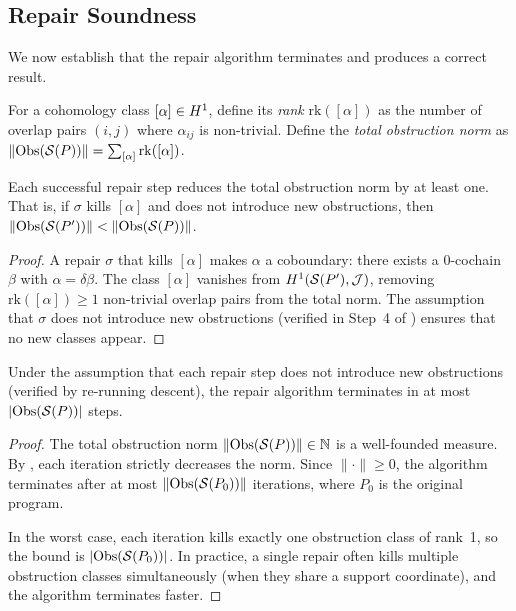 \subsection{Repair Soundness}\label{sec:repair-soundness}

We now establish that the repair algorithm terminates and produces
a correct result.

\begin{definition}\label{def:cocycle-norm}
For a cohomology class $[\alpha] \in H^{1}$, define its
\emph{rank} $\mathrm{rk}([\alpha])$ as the number of overlap pairs
$(i,j)$ where $\alpha_{ij}$ is non-trivial.  Define the
\emph{total obstruction norm} as
$\lVert \mathrm{Obs}(\mathcal{S}(P)) \rVert =
 \sum_{[\alpha]} \mathrm{rk}([\alpha])$.
\end{definition}

\begin{lemma}\label{lem:norm-reduce}
Each successful repair step reduces the total obstruction norm by at
least one.  That is, if $\sigma$ kills $[\alpha]$ and does not
introduce new obstructions, then
$\lVert \mathrm{Obs}(\mathcal{S}(P')) \rVert <
 \lVert \mathrm{Obs}(\mathcal{S}(P)) \rVert$.
\end{lemma}

\begin{proof}
A repair $\sigma$ that kills $[\alpha]$ makes $\alpha$ a coboundary:
there exists a 0-cochain $\beta$ with $\alpha = \delta\beta$.  The
class $[\alpha]$ vanishes from $H^{1}(\mathcal{S}(P'), \mathcal{J})$, removing
$\mathrm{rk}([\alpha]) \geq 1$ non-trivial overlap pairs from the
total norm.  The assumption that $\sigma$ does not introduce new
obstructions (verified in Step~4 of ) ensures
that no new classes appear.
\end{proof}

\begin{theorem}\label{thm:repair-term}
Under the assumption that each repair step does not introduce new
obstructions (verified by re-running descent), the repair algorithm
terminates in at most $\lvert \mathrm{Obs}(\mathcal{S}(P)) \rvert$ steps.
\end{theorem}

\begin{proof}
The total obstruction norm
$\lVert \mathrm{Obs}(\mathcal{S}(P)) \rVert \in \mathbb{N}$ is a
well-founded measure.  By , each iteration
strictly decreases the norm.  Since $\lVert \cdot \rVert \geq 0$,
the algorithm terminates after at most
$\lVert \mathrm{Obs}(\mathcal{S}(P_0)) \rVert$ iterations, where $P_0$ is
the original program.

In the worst case, each iteration kills exactly one obstruction class
of rank~1, so the bound is $|\mathrm{Obs}(\mathcal{S}(P_0))|$.  In
practice, a single repair often kills multiple obstruction classes
simultaneously (when they share a support coordinate), and the
algorithm terminates faster.
\end{proof}

